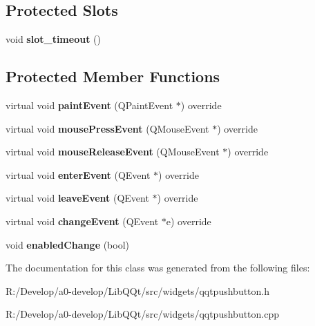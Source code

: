 \subsection*{Protected Slots}
\begin{DoxyCompactItemize}
\item 
\mbox{\label{class_q_qt_push_button_ae30f371d1e928cdffdcd2068cce05747}} 
void {\bfseries slot\+\_\+timeout} ()
\end{DoxyCompactItemize}
\subsection*{Protected Member Functions}
\begin{DoxyCompactItemize}
\item 
\mbox{\label{class_q_qt_push_button_ae0fffc882a6ef0d2984f9a4255197d7f}} 
virtual void {\bfseries paint\+Event} (Q\+Paint\+Event $\ast$) override
\item 
\mbox{\label{class_q_qt_push_button_a2876ab8c55e178e9b996531de8976b49}} 
virtual void {\bfseries mouse\+Press\+Event} (Q\+Mouse\+Event $\ast$) override
\item 
\mbox{\label{class_q_qt_push_button_ae08cf4975b46ff9b221ae0850cf56aee}} 
virtual void {\bfseries mouse\+Release\+Event} (Q\+Mouse\+Event $\ast$) override
\item 
\mbox{\label{class_q_qt_push_button_a807a43351e3cd14c7f6781e4559c7d5e}} 
virtual void {\bfseries enter\+Event} (Q\+Event $\ast$) override
\item 
\mbox{\label{class_q_qt_push_button_a579c8fbb40b86f7200d8d089dc8e0a2d}} 
virtual void {\bfseries leave\+Event} (Q\+Event $\ast$) override
\item 
\mbox{\label{class_q_qt_push_button_a00cbd1dafd0cb47a088a2c9b68405ec4}} 
virtual void {\bfseries change\+Event} (Q\+Event $\ast$e) override
\item 
\mbox{\label{class_q_qt_push_button_a57af629750e9adaffe7f951c14baa0b0}} 
void {\bfseries enabled\+Change} (bool)
\end{DoxyCompactItemize}


The documentation for this class was generated from the following files\+:\begin{DoxyCompactItemize}
\item 
R\+:/\+Develop/a0-\/develop/\+Lib\+Q\+Qt/src/widgets/qqtpushbutton.\+h\item 
R\+:/\+Develop/a0-\/develop/\+Lib\+Q\+Qt/src/widgets/qqtpushbutton.\+cpp\end{DoxyCompactItemize}
